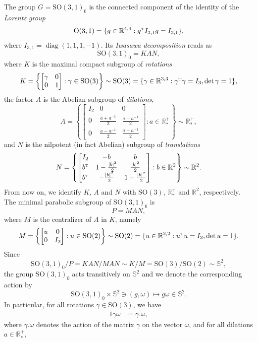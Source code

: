 \documentclass[a4paper,11pt,DIV=11,%
abstract=on%
]{scrartcl}
\def\tT{{\mbox{\tiny{T}}}}
\def\SO{{\mathrm{SO}}}
\def\Oo{{\mathrm{O}}}
\def\R{{\mathbb R}}
\begin{document}
{The group $G=\SO(3,1)_0$ is the connected component of the identity of the \emph{Lorentz group}
\[ \Oo(3,1) = \{ g \in \mathbb R^{4,4}: g^\tT I_{3,1}  g = I_{3,1}\},\] 
where $I_{3,1}=\operatorname{diag}(1,1,1,-1)$. Its \emph{Iwasawa
  decomposition} reads as 
$$\SO(3,1)_0=KAN,$$
where $K$ is the maximal compact subgroup of \emph{rotations }
\[
K=\left\{
\begin{bmatrix}
  \gamma & 0\\
  0 & 1
\end{bmatrix} : \gamma \in \SO(3) \right\} \sim \SO(3)= \{\gamma  \in
\mathbb R^{3,3}: 
\gamma^\tT \gamma = I_3, \det \gamma = 1\}  ,
  \]
the factor $A$ is the Abelian subgroup of \emph{dilations}, 
\[
A = \left\{
\begin{bmatrix}
I_2 & 0 & 0 \\
  0  & \frac{a+a^{-1}}{2} &\frac{a-a^{-1}}{2} \\
  0  & \frac{a-a^{-1}}{2}& \frac{a+a^{-1}}{2}
\end{bmatrix} :  a \in \R_*^+ \right\} \sim \R_*^+,
 \]
 and $N $ is the nilpotent (in fact Abelian) subgroup of \emph{translations}
\[
N = \left\{
\begin{bmatrix}
   I_2 & -b  &   b \\
  b^\tT  &  1- \frac{|b|^2}{2}&  \frac{|b|^2}{2}\\
  b^\tT  & -\frac{|b|^2}{2} & 1+\frac{|b|^2}{2}
\end{bmatrix} :  b \in  \R^2 \right\} \sim \R^2 .
\]
From now on, we identify $K$, $A$ and $N$ with $\SO(3)$, $\R_*^+$ and
$\R^2$, respectively. The minimal parabolic subgroup of $\SO(3,1)_0$ is
    \[ P= MAN,\]
 where $M$ is the centralizer of $A$ in $K$, namely
\[
M=\left\{
\begin{bmatrix}
u&0\\
 0& I_2
\end{bmatrix} :u\in \SO(2)\right\} \sim \SO(2) = \{ u \in
\mathbb R^{2,2}: 
u^\tT u = I_2, \det u = 1\}.  
\]
Since 
\[
\SO(3,1)_0/P = KAN/MAN\sim K/M=\SO(3)/\SO(2)\sim \mathbb S^2,
  \]
the group $\SO(3,1)_0$ acts transitively on $\mathbb S^2$ and we denote
the corresponding action  by
\[
\SO(3,1)_0\times \mathbb S^2 \ni (g,\omega)\mapsto g\omega \in \mathbb S^2 .
  \]
  In particular, for all rotations $\gamma\in \SO(3)$, we have
  \begin{alignat}{1}
    \label{eq:4}
    \gamma \omega & = \gamma .\omega ,
  \end{alignat}
  where $\gamma .\omega $ denotes the action of the matrix $\gamma$ on
  the vector $\omega$, and for all  dilations $a\in \R_*^+$,
}
\end{document}
